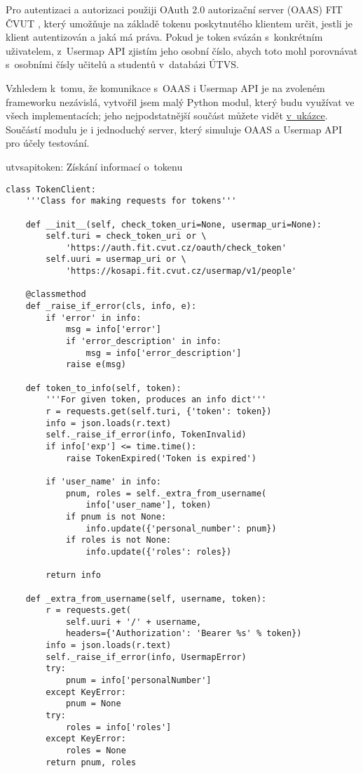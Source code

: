 Pro autentizaci a autorizaci použiji OAuth 2.0 autorizační server (OAAS) FIT ČVUT \autocite{oaas}, který umožňuje na základě tokenu poskytnutého klientem určit, jestli je klient autentizován a jaká má práva. Pokud je token svázán s~konkrétním uživatelem, z~Usermap API \autocite{uapi} zjistím jeho osobní číslo, abych toto mohl porovnávat s~osobními čísly učitelů a studentů v~databázi ÚTVS.

Vzhledem k~tomu, že komunikace s~OAAS i Usermap API je na zvoleném frameworku nezávislá, vytvořil jsem malý Python modul, který budu využívat ve všech implementacích; jeho nejpodstatnější součást můžete vidět \protect\hyperlink{code:utvsapitoken}{v~ukázce}. Součástí modulu je i jednoduchý server, který simuluje OAAS a Usermap API pro účely testování.

\begin{listing}[htbp]
\caption{{\label{code:utvsapitoken}utvsapitoken: Získání informací o~tokenu}}
\begin{verbatim}
class TokenClient:
    '''Class for making requests for tokens'''

    def __init__(self, check_token_uri=None, usermap_uri=None):
        self.turi = check_token_uri or \
            'https://auth.fit.cvut.cz/oauth/check_token'
        self.uuri = usermap_uri or \
            'https://kosapi.fit.cvut.cz/usermap/v1/people'

    @classmethod
    def _raise_if_error(cls, info, e):
        if 'error' in info:
            msg = info['error']
            if 'error_description' in info:
                msg = info['error_description']
            raise e(msg)

    def token_to_info(self, token):
        '''For given token, produces an info dict'''
        r = requests.get(self.turi, {'token': token})
        info = json.loads(r.text)
        self._raise_if_error(info, TokenInvalid)
        if info['exp'] <= time.time():
            raise TokenExpired('Token is expired')

        if 'user_name' in info:
            pnum, roles = self._extra_from_username(
                info['user_name'], token)
            if pnum is not None:
                info.update({'personal_number': pnum})
            if roles is not None:
                info.update({'roles': roles})

        return info

    def _extra_from_username(self, username, token):
        r = requests.get(
            self.uuri + '/' + username,
            headers={'Authorization': 'Bearer %s' % token})
        info = json.loads(r.text)
        self._raise_if_error(info, UsermapError)
        try:
            pnum = info['personalNumber']
        except KeyError:
            pnum = None
        try:
            roles = info['roles']
        except KeyError:
            roles = None
        return pnum, roles
\end{verbatim}
\end{listing}

